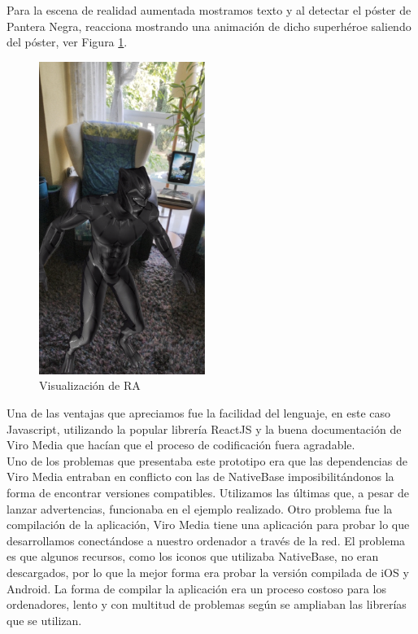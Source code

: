 Para la escena de realidad aumentada mostramos texto y al detectar el póster de Pantera Negra,
reacciona mostrando una animación de dicho superhéroe saliendo del póster, ver Figura \ref{fig:visualizacionRANAtibe}.
 
\begin{figure}[H]
    \centering
    \includegraphics[height=4in]{figures/chapter-3/viromedia/blackpanther.png}
    \caption{Visualización de RA}
    \label{fig:visualizacionRANAtibe}
\end{figure}
\newpage
Una de las ventajas que apreciamos fue la facilidad del lenguaje, en este caso Javascript,
 utilizando la popular librería ReactJS y la buena documentación de Viro Media
 que hacían que el proceso de codificación fuera agradable.\\

Uno de los problemas que presentaba este prototipo era que las dependencias de Viro Media entraban en conflicto con las de NativeBase
imposibilitándonos la forma de encontrar versiones compatibles. Utilizamos las últimas que, a pesar de lanzar
 advertencias, funcionaba en el ejemplo realizado.
Otro problema fue la compilación de la aplicación, Viro Media tiene una aplicación para probar lo
 que desarrollamos conectándose a nuestro ordenador a través de la red. El problema es
 que algunos recursos, como los iconos que utilizaba NativeBase, no eran descargados, por lo que la
 mejor forma era probar la versión compilada de iOS y Android. La forma de compilar
 la aplicación era un proceso costoso para los ordenadores, lento y con multitud de problemas según
 se ampliaban las librerías que se utilizan.\\

